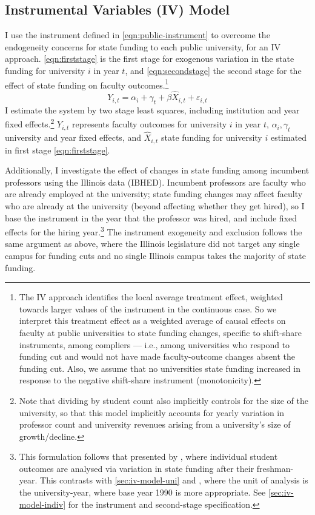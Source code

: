\subsection{Instrumental Variables (IV) Model}
\label{sec:iv-model-uni}

I use the instrument defined in \autoref{eqn:public-instrument} to overcome the endogeneity concerns for state funding to each public university, for an IV approach.
\autoref{eqn:firststage} is the first stage for exogenous variation in the state funding for university $i$ in year $t$, and \autoref{eqn:secondstage} the second stage for the effect of state funding on faculty outcomes.\footnote{
    The IV approach identifies the local average treatment effect, weighted towards larger values of the instrument in the continuous case.
    So we interpret this treatment effect as a weighted average of causal effects on faculty at public universities to state funding changes, specific to shift-share instruments, among compliers --- i.e., among universities who respond to funding cut and would not have made faculty-outcome changes absent the funding cut.
    Also, we assume that no universities state funding increased in response to the negative shift-share instrument (monotonicity).
}
\begin{equation}
    \label{eqn:secondstage}
    Y_{i,t} = \alpha_i + \gamma_t + \beta \widehat X_{i,t} + \varepsilon_{i,t}
\end{equation}
I estimate the system by two stage least squares, including institution and year fixed effects.\footnote{
    Note that dividing by student count also implicitly controls for the size of the university, so that this model implicitly accounts for yearly variation in professor count and university revenues arising from a university's size of growth/decline.
}
$Y_{i,t}$ represents faculty outcomes for university $i$ in year $t$, $\alpha_i, \gamma_t$ university and year fixed effects, and $\widehat X_{i,t}$ state funding for university $i$ estimated in first stage \eqref{eqn:firststage}.

Additionally, I investigate the effect of changes in state funding among incumbent professors using the Illinois data (IBHED).
Incumbent professors are faculty who are already employed at the university; state funding changes may affect faculty who are already at the university (beyond affecting whether they get hired), so I base the instrument in the year that the professor was hired, and include fixed effects for the hiring year.\footnote{
    This formulation follows that presented by \cite{NBERw27885}, where individual student outcomes are analysed via variation in state funding after their freshman-year.
    This contrasts with \autoref{sec:iv-model-uni} and \cite{NBERw23736}, where the unit of analysis is the university-year, where base year 1990 is more appropriate.
    See \autoref{sec:iv-model-indiv} for the instrument and second-stage specification.
}
The instrument exogeneity and exclusion follows the same argument as above, where the Illinois legislature did not target any single campus for funding cuts and no single Illinois campus takes the majority of state funding.

